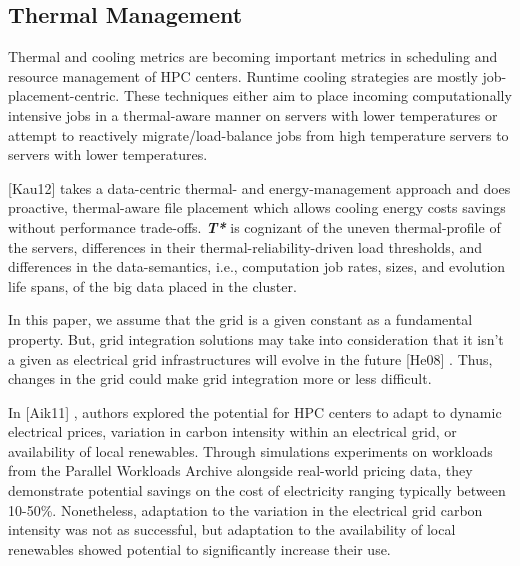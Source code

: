 \subsection{Thermal Management}
Thermal and cooling metrics are becoming important metrics in scheduling and
resource management of HPC centers. Runtime cooling strategies are mostly
job-placement-centric. These techniques either aim to place incoming
computationally intensive jobs in a thermal-aware manner on servers with
lower temperatures or attempt to reactively migrate/load-balance jobs from
high temperature servers to servers with lower temperatures.

\cite{kaushik_t*:_2012}
[Kau12]
 takes a data-centric thermal- and
energy-management approach and does proactive, thermal-aware file placement
which allows cooling energy costs savings without performance trade-offs. \textbf{\textit{T* }} 
is cognizant of the uneven thermal-profile of the servers, differences in
their thermal-reliability-driven load thresholds, and differences in the
data-semantics, i.e., computation job rates, sizes, and evolution life
spans, of the big data placed in the cluster.

In this paper, we assume that the grid is a given constant as a fundamental
property. But, grid integration solutions may take into consideration that
it isn't a given as electrical grid infrastructures will evolve in the
future 
\cite{he_architecture_2008}
[He08]
. Thus, changes in the grid could make grid integration more or
less difficult.


In 
\cite{aikema_electrical_2011}
[Aik11] , authors explored the potential for HPC centers to adapt to
dynamic electrical prices, variation in carbon intensity within an
electrical grid, or availability of local renewables. Through simulations
experiments on workloads from the Parallel Workloads Archive alongside
real-world pricing data, they demonstrate potential savings on the cost of
electricity ranging typically between 10-50{\%}. Nonetheless, adaptation to
the variation in the electrical grid carbon intensity was not as successful,
but adaptation to the availability of local renewables showed potential to
significantly increase their use.